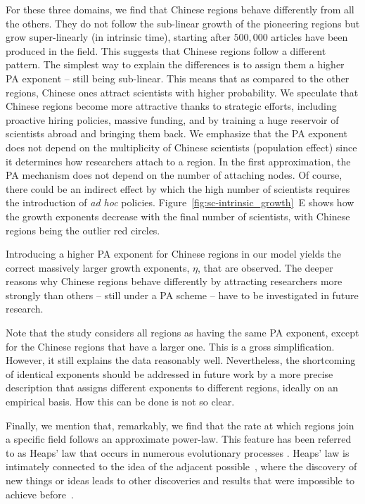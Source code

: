 \documentclass[draft,final]{vutinfth} %
\begin{document}
For these three domains, we find that Chinese regions behave differently from all the others. They do not follow the sub-linear growth of the pioneering regions but grow super-linearly (in intrinsic time), starting after $500,000$ articles have been produced in the field. This suggests that Chinese regions follow a different pattern.
The simplest way to explain the differences is to assign them a higher PA exponent -- still being sub-linear. This means that as compared to the other regions, Chinese ones attract scientists with higher probability.
We speculate that Chinese regions become more attractive thanks to strategic efforts, including proactive hiring policies, massive funding, and by training a huge reservoir of scientists abroad and bringing them back.
We emphasize that the PA exponent does not depend on the multiplicity of Chinese scientists (population effect) since it determines how researchers attach to a region. In the first approximation, the PA mechanism does not depend on the number of attaching nodes. Of course, there could be an indirect effect by which the high number of scientists requires the introduction of \emph{ad hoc} policies. 
Figure~\ref{fig:sc-intrinsic_growth}~E shows how the growth exponents decrease with the final number of scientists, with Chinese regions being the outlier red circles.

Introducing a higher PA exponent for Chinese regions in our model yields the correct massively larger growth exponents, $\eta$, that are observed. The deeper reasons why Chinese regions behave differently by attracting researchers more strongly than others -- still under a PA scheme -- have to be investigated in future research.

Note that the study considers all regions as having the same PA exponent, except for the Chinese regions that have a larger one. 
This is a gross simplification. However, it still explains the data reasonably well. Nevertheless, the shortcoming of identical exponents should be addressed in future work by a more precise description that assigns different exponents to different regions, ideally on an empirical basis. How this can be done is not so clear. 

Finally, we mention that, remarkably, we find that the rate at which regions join a specific field follows an approximate power-law. This feature has been referred to as Heaps' law that occurs in numerous evolutionary processes \cite{Serrano09,Tria14,Mazzolini18,Simini19}. 
Heaps' law is intimately connected to the idea of the adjacent possible~\cite{Tria18}, where the discovery of new things or ideas leads to other discoveries and results that were impossible to achieve before~\cite{Kauffman00}.
\end{document}
